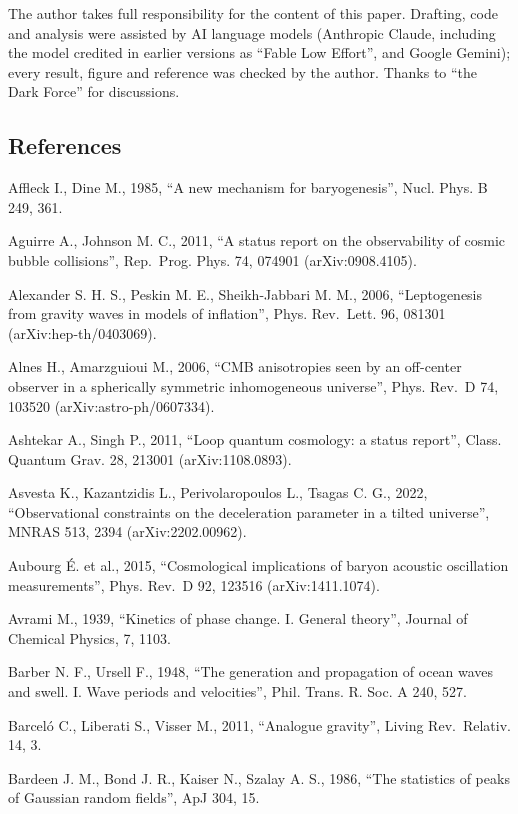 \documentclass[
  11pt,
]{article}
\begin{document}
The author takes full responsibility for the content of this paper.
Drafting, code and analysis were assisted by AI language models
(Anthropic Claude, including the model credited in earlier versions as
``Fable Low Effort'', and Google Gemini); every result, figure and
reference was checked by the author. Thanks to ``the Dark Force'' for
discussions.

\hypertarget{references}{%
\subsection{\texorpdfstring{\textbf{References}}{References}}\label{references}}

Affleck I., Dine M., 1985, ``A new mechanism for baryogenesis'', Nucl.
Phys. B 249, 361.

Aguirre A., Johnson M. C., 2011, ``A status report on the observability
of cosmic bubble collisions'', Rep.~Prog. Phys. 74, 074901
(arXiv:0908.4105).

Alexander S. H. S., Peskin M. E., Sheikh-Jabbari M. M., 2006,
``Leptogenesis from gravity waves in models of inflation'', Phys.
Rev.~Lett. 96, 081301 (arXiv:hep-th/0403069).

Alnes H., Amarzguioui M., 2006, ``CMB anisotropies seen by an off-center
observer in a spherically symmetric inhomogeneous universe'', Phys.
Rev.~D 74, 103520 (arXiv:astro-ph/0607334).

Ashtekar A., Singh P., 2011, ``Loop quantum cosmology: a status
report'', Class. Quantum Grav. 28, 213001 (arXiv:1108.0893).

Asvesta K., Kazantzidis L., Perivolaropoulos L., Tsagas C. G., 2022,
``Observational constraints on the deceleration parameter in a tilted
universe'', MNRAS 513, 2394 (arXiv:2202.00962).

Aubourg É. et al., 2015, ``Cosmological implications of baryon acoustic
oscillation measurements'', Phys. Rev.~D 92, 123516 (arXiv:1411.1074).

Avrami M., 1939, ``Kinetics of phase change. I. General theory'',
Journal of Chemical Physics, 7, 1103.

Barber N. F., Ursell F., 1948, ``The generation and propagation of ocean
waves and swell. I. Wave periods and velocities'', Phil. Trans. R. Soc.
A 240, 527.

Barceló C., Liberati S., Visser M., 2011, ``Analogue gravity'', Living
Rev.~Relativ. 14, 3.

Bardeen J. M., Bond J. R., Kaiser N., Szalay A. S., 1986, ``The
statistics of peaks of Gaussian random fields'', ApJ 304, 15.
\end{document}
